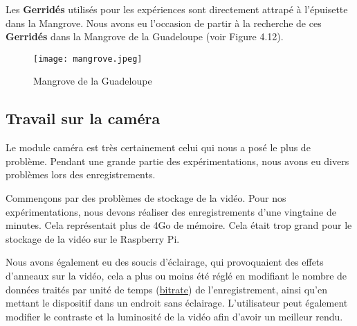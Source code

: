         \vspace{0.2cm}

        Les \textbf{Gerridés} utilisés pour les expériences sont directement attrapé à l'épuisette dans la Mangrove. Nous avons eu l'occasion de partir à la recherche de ces \textbf{Gerridés} dans la Mangrove de la Guadeloupe (voir Figure 4.12).

        \begin{figure}[ht]
            \centering
            \texttt{[image: mangrove.jpeg]}
            \caption{Mangrove de la Guadeloupe}
        \end{figure}

        \vspace{3.5cm}
             
        \subsection{Travail sur la caméra}
        Le module caméra est très certainement celui qui nous a posé le plus de problème. Pendant une grande partie des expérimentations, nous avons eu divers problèmes lors des enregistrements.

        \vspace{0.2cm}

        Commençons par des problèmes de stockage de la vidéo. Pour nos expérimentations, nous devons réaliser des enregistrements d'une vingtaine de minutes.
        Cela représentait plus de 4Go de mémoire.
        Cela était trop grand pour le stockage de la vidéo sur le Raspberry Pi.

        \vspace{0.2cm}

        Nous avons également eu des soucis d'éclairage, qui provoquaient des effets d'anneaux sur la vidéo, cela a plus ou moins été réglé en modifiant le nombre de données traités par unité de temps (\underline{bitrate}) de l'enregistrement, ainsi qu'en mettant le dispositif dans un endroit sans éclairage.
        L'utilisateur peut également modifier le contraste et la luminosité de la vidéo afin d'avoir un meilleur rendu.

        \vspace{0.2cm}


